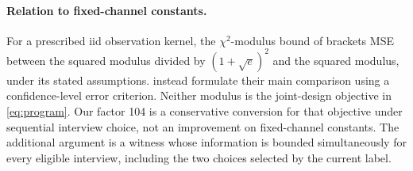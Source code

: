 \paragraph{Relation to fixed-channel constants.}
For a prescribed iid observation kernel, the $\chi^2$-modulus bound of \citet{polyanskiy2026} brackets MSE between the squared modulus divided by $(1+\sqrt e)^2$ and the squared modulus, under its stated assumptions. \citet{juditsky2009} instead formulate their main comparison using a confidence-level error criterion. Neither modulus is the joint-design objective in \eqref{eq:program}. Our factor 104 is a conservative conversion for that objective under sequential interview choice, not an improvement on fixed-channel constants. The additional argument is a witness whose information is bounded simultaneously for every eligible interview, including the two choices selected by the current label.

